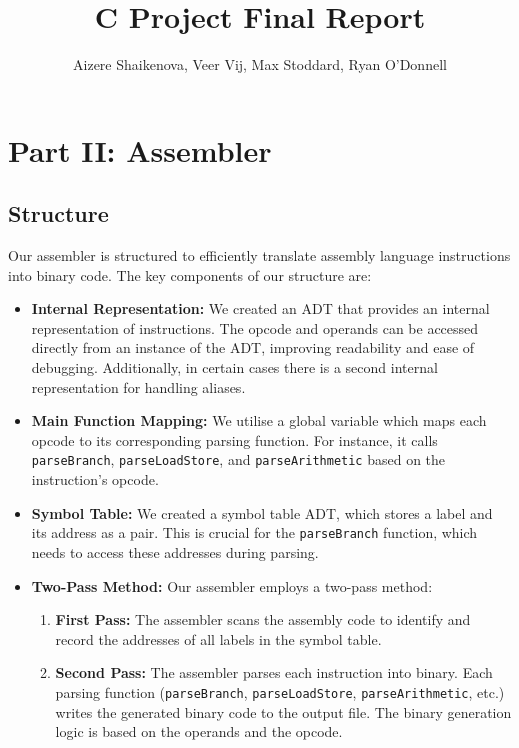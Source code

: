 \documentclass{article}
\title{C Project Final Report}
\author{Aizere Shaikenova, Veer Vij, Max Stoddard, Ryan O'Donnell}
\begin{document}
\small
\maketitle



\section{Part II: Assembler}
\label{sec:assembler}
\subsection{Structure}
Our assembler is structured to efficiently translate assembly language instructions into binary code. The key components of our structure are:

\begin{itemize}
    \item \textbf{Internal Representation:} We created an ADT that provides an internal representation of instructions. The opcode and operands can be accessed directly from an instance of the ADT, improving readability and ease of debugging. Additionally, in certain cases there is a second internal representation for handling aliases.
    \item \textbf{Main Function Mapping:} We utilise a global variable which maps each opcode to its corresponding parsing function. For instance, it calls \texttt{parseBranch}, \texttt{parseLoadStore}, and \texttt{parseArithmetic} based on the instruction's opcode.
    \item \textbf{Symbol Table:} We created a symbol table ADT, which stores a label and its address as a pair. This is crucial for the \texttt{parseBranch} function, which needs to access these addresses during parsing.
    \item \textbf{Two-Pass Method:} Our assembler employs a two-pass method:
    \begin{enumerate}
        \item \textbf{First Pass:} The assembler scans the assembly code to identify and record the addresses of all labels in the symbol table.
        \item \textbf{Second Pass:} The assembler parses each instruction into binary. Each parsing function (\texttt{parseBranch}, \texttt{parseLoadStore}, \texttt{parseArithmetic}, etc.) writes the generated binary code to the output file. The binary generation logic is based on the operands and the opcode.
    \end{enumerate}
\end{itemize}
\end{document}
